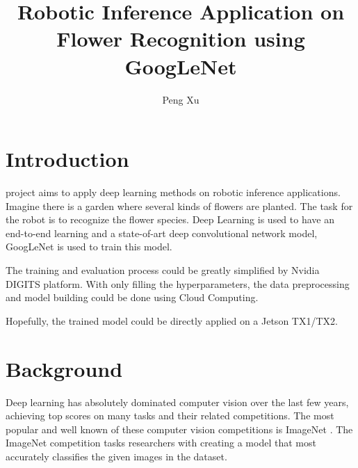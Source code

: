 \documentclass[10pt,journal,compsoc]{IEEEtran}
\begin{document}
\title{Robotic Inference Application on Flower Recognition using GoogLeNet}

\author{Peng Xu}

%
{}


\maketitle
\IEEEdisplaynontitleabstractindextext
\IEEEpeerreviewmaketitle
\section{Introduction}
\label{sec:introduction}

 project aims to apply deep learning methods on robotic inference applications. Imagine there is a garden where several kinds of flowers are planted. The task for the robot is to recognize the flower species. Deep Learning is used to have an end-to-end learning and a state-of-art deep convolutional network model, GoogLeNet is used to train this model.

The training and evaluation process could be greatly simplified by Nvidia DIGITS platform. With only filling the hyperparameters, the data preprocessing and model building could be done using Cloud Computing.

Hopefully, the trained model could be directly applied on a Jetson TX1/TX2.
 
\section{Background}

Deep learning has absolutely dominated computer vision over the last few years, achieving top scores on many tasks and their related competitions. The most popular and well known of these computer vision competitions is ImageNet \cite{imagenet_cvpr09}. The ImageNet competition tasks researchers with creating a model that most accurately classifies the given images in the dataset.
\end{document}
